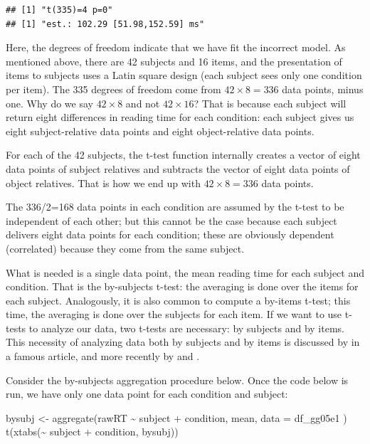 \documentclass[
  12pt,
]{krantz}
\newenvironment{Shaded}{\begin{snugshade}}{\end{snugshade}}
\newcommand{\AttributeTok}[1]{\textcolor[rgb]{0.77,0.63,0.00}{#1}}
\newcommand{\FunctionTok}[1]{\textcolor[rgb]{0.00,0.00,0.00}{#1}}
\newcommand{\NormalTok}[1]{#1}
\newcommand{\OtherTok}[1]{\textcolor[rgb]{0.56,0.35,0.01}{#1}}
\newcommand{\SpecialCharTok}[1]{\textcolor[rgb]{0.00,0.00,0.00}{#1}}
\theoremstyle{definition}
\theoremstyle{definition}
\theoremstyle{definition}
\theoremstyle{definition}
\theoremstyle{remark}
\begin{document}
\begin{verbatim}
## [1] "t(335)=4 p=0"
## [1] "est.: 102.29 [51.98,152.59] ms"
\end{verbatim}

Here, the degrees of freedom indicate that we have fit the incorrect model. As mentioned above, there are 42 subjects and 16 items, and the presentation of items to subjects uses a Latin square design (each subject sees only one condition per item). The 335 degrees of freedom come from \(42\times 8=336\) data points, minus one. Why do we say \(42\times 8\) and not \(42\times 16\)? That is because each subject will return eight differences in reading time for each condition: each subject gives us eight subject-relative data points and eight object-relative data points.

For each of the 42 subjects, the t-test function internally creates a vector of eight data points of subject relatives and subtracts the vector of eight data points of object relatives. That is how we end up with \(42\times 8=336\) data points.

The 336/2=168 data points in each condition are assumed by the t-test to be independent of each other; but this cannot be the case because each subject delivers eight data points for each condition; these are obviously dependent (correlated) because they come from the same subject.

What is needed is a single data point, the mean reading time for each subject and condition. That is the by-subjects t-test: the averaging is done over the items for each subject. Analogously, it is also common to compute a by-items t-test; this time, the averaging is done over the subjects for each item. If we want to use t-tests to analyze our data, two t-tests are necessary: by subjects and by items. This necessity of analyzing data both by subjects and by items is discussed by \citet{clark73} in a famous article, and more recently by \citet{yarkonigeneralizability} and \citet{westfall2017}.

Consider the by-subjects aggregation procedure below. Once the code below is run, we have only one data point for each condition and subject:

\begin{Shaded}
\begin{Highlighting}[]
\NormalTok{bysubj }\OtherTok{\textless{}{-}} \FunctionTok{aggregate}\NormalTok{(rawRT }\SpecialCharTok{\textasciitilde{}}\NormalTok{ subject }\SpecialCharTok{+}\NormalTok{ condition,}
\NormalTok{  mean,}
  \AttributeTok{data =}\NormalTok{ df\_gg05e1}
\NormalTok{)}
\FunctionTok{t}\NormalTok{(}\FunctionTok{xtabs}\NormalTok{(}\SpecialCharTok{\textasciitilde{}}\NormalTok{ subject }\SpecialCharTok{+}\NormalTok{ condition, bysubj))}
\end{Highlighting}
\end{Shaded}
\end{document}

